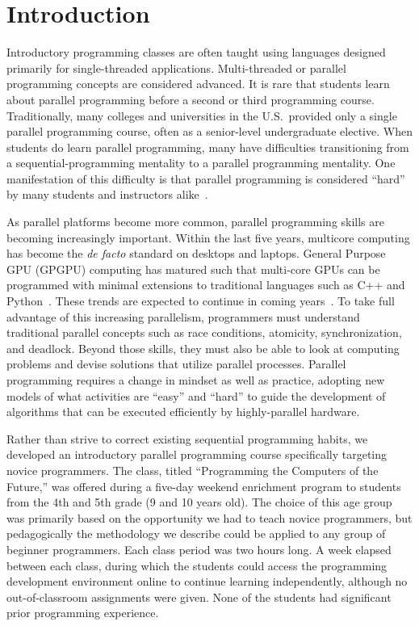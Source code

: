 \documentclass{sig-alternate}
\begin{document}
\section{Introduction}
Introductory programming classes are often taught using languages designed primarily for single-threaded applications.  
Multi-threaded or parallel programming concepts are considered advanced. 
It is rare that students learn about parallel programming before a second or third programming course.  
Traditionally, many colleges and universities in the U.S.\ provided only a single parallel programming course, often as a senior-level undergraduate elective. 
When students do learn parallel programming, many have difficulties transitioning from a sequential-programming mentality to a parallel programming mentality.
One manifestation of this difficulty is that parallel programming is considered ``hard'' by many students and instructors alike~\cite{parallelExpectations}.

As parallel platforms become more common, parallel programming skills are becoming increasingly important.  
Within the last five years, multicore computing has become the \emph{de facto} standard on desktops and laptops.
General Purpose GPU (GPGPU) computing has matured such that multi-core GPUs can be programmed with minimal extensions to traditional languages such as C++ and Python~\cite{gpgpuLanguages}.  
These trends are expected to continue in coming years~\cite{multicoreTrends}.
To take full advantage of this increasing parallelism, programmers must understand traditional parallel concepts such as race conditions, atomicity, synchronization, and deadlock.
Beyond those skills, they must also be able to look at computing problems and devise solutions that utilize parallel processes.
Parallel programming requires a change in mindset as well as practice, adopting new models of what activities are ``easy'' and ``hard'' to guide the development of algorithms that can be executed efficiently by highly-parallel hardware.

Rather than strive to correct existing sequential programming habits,
we developed an introductory parallel programming course specifically targeting novice programmers.
The class, titled ``Programming the Computers of the Future,'' was offered during a five-day weekend
enrichment program to students from the 4th and 5th grade (9 and 10 years old).  The choice of 
this age group was primarily based on the opportunity we had to teach novice programmers, but
pedagogically the methodology we describe could be applied to any group of beginner programmers.
Each class period was two hours long.
A week elapsed between each class, during which the students
could access the programming development environment online to continue learning independently,
although no out-of-classroom assignments were given.
None of the students had significant prior programming experience.
\end{document}
